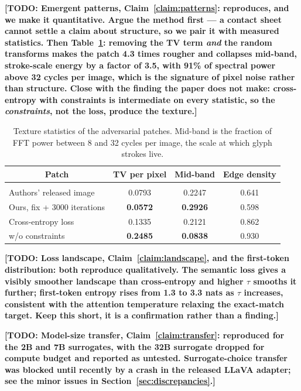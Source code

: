 \documentclass[10pt]{article} %
\newcommand{\todo}[1]{\textbf{[TODO: #1]}}
\begin{document}
\todo{Emergent patterns, Claim~\ref{claim:patterns}: reproduces, and we make it quantitative. Argue the method first --- a contact sheet cannot settle a claim about structure, so we pair it with measured statistics. Then Table~\ref{tab:texture}: removing the TV term \emph{and} the random transforms makes the patch 4.3 times rougher and collapses mid-band, stroke-scale energy by a factor of 3.5, with 91\% of spectral power above 32 cycles per image, which is the signature of pixel noise rather than structure. Close with the finding the paper does not make: cross-entropy with constraints is intermediate on every statistic, so the \emph{constraints}, not the loss, produce the texture.}

\begin{table}[t]
\caption{Texture statistics of the adversarial patches. Mid-band is the fraction of FFT power between
8 and 32 cycles per image, the scale at which glyph strokes live.}
\label{tab:texture}
\begin{center}
\begin{tabular}{lccc}
\multicolumn{1}{c}{\bf Patch} & \multicolumn{1}{c}{\bf TV per pixel} & \multicolumn{1}{c}{\bf Mid-band} & \multicolumn{1}{c}{\bf Edge density}
\\ \hline \\
Authors' released image       & 0.0793 & 0.2247 & 0.641 \\
Ours, fix + 3000 iterations   & {\bf 0.0572} & {\bf 0.2926} & 0.598 \\
Cross-entropy loss            & 0.1335 & 0.2121 & 0.862 \\
w/o constraints               & {\bf 0.2485} & {\bf 0.0838} & 0.930 \\
\end{tabular}
\end{center}
\end{table}

\todo{Loss landscape, Claim~\ref{claim:landscape}, and the first-token distribution: both reproduce qualitatively. The semantic loss gives a visibly smoother landscape than cross-entropy and higher $\tau$ smooths it further; first-token entropy rises from 1.3 to 3.3 nats as $\tau$ increases, consistent with the attention temperature relaxing the exact-match target. Keep this short, it is a confirmation rather than a finding.}

\todo{Model-size transfer, Claim~\ref{claim:transfer}: reproduced for the 2B and 7B surrogates, with the 32B surrogate dropped for compute budget and reported as untested. Surrogate-choice transfer was blocked until recently by a crash in the released LLaVA adapter; see the minor issues in Section~\ref{sec:discrepancies}.}
\end{document}
